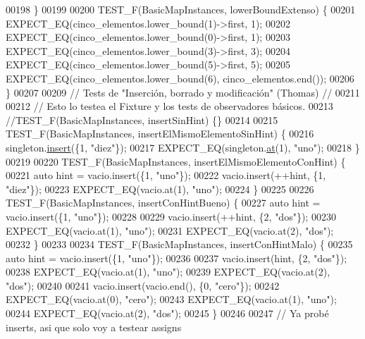 \begin{DoxyCode}
00198 \}
00199 
00200 TEST\_F(BasicMapInstances, lowerBoundExtenso) \{
00201     EXPECT\_EQ(cinco\_elementos.lower\_bound(1)->first, 1);
00202     EXPECT\_EQ(cinco\_elementos.lower\_bound(0)->first, 1);
00203     EXPECT\_EQ(cinco\_elementos.lower\_bound(3)->first, 3);
00204     EXPECT\_EQ(cinco\_elementos.lower\_bound(5)->first, 5);
00205     EXPECT\_EQ(cinco\_elementos.lower\_bound(6), cinco\_elementos.end());
00206 \}
00207 
00209 \textcolor{comment}{// Tests de "Inserción, borrado y modificación" (Thomas) //}
00211 \textcolor{comment}{}
00212 \textcolor{comment}{// Esto lo testea el Fixture y los tests de observadores básicos.}
00213 \textcolor{comment}{//TEST\_F(BasicMapInstances, insertSinHint) \{\}}
00214 
00215 TEST\_F(BasicMapInstances, insertElMismoElementoSinHint) \{
00216     singleton.\hyperlink{classaed2_1_1map_a60aacba06b1579630b3c8e996cf248c8_a60aacba06b1579630b3c8e996cf248c8}{insert}(\{1, \textcolor{stringliteral}{"diez"}\});
00217     EXPECT\_EQ(singleton.\hyperlink{classaed2_1_1map_a0b0a11f906da2926f9eb342fcee79fd7_a0b0a11f906da2926f9eb342fcee79fd7}{at}(1), \textcolor{stringliteral}{"uno"});
00218 \}
00219 
00220 TEST\_F(BasicMapInstances, insertElMismoElementoConHint) \{
00221     \textcolor{keyword}{auto} hint = vacio.insert(\{1, \textcolor{stringliteral}{"uno"}\});
00222     vacio.insert(++hint, \{1, \textcolor{stringliteral}{"diez"}\});
00223     EXPECT\_EQ(vacio.at(1), \textcolor{stringliteral}{"uno"});
00224 \}
00225 
00226 TEST\_F(BasicMapInstances, insertConHintBueno) \{
00227     \textcolor{keyword}{auto} hint = vacio.insert(\{1, \textcolor{stringliteral}{"uno"}\});
00228 
00229     vacio.insert(++hint, \{2, \textcolor{stringliteral}{"dos"}\});
00230     EXPECT\_EQ(vacio.at(1), \textcolor{stringliteral}{"uno"});
00231     EXPECT\_EQ(vacio.at(2), \textcolor{stringliteral}{"dos"});
00232 \}
00233 
00234 TEST\_F(BasicMapInstances, insertConHintMalo) \{
00235     \textcolor{keyword}{auto} hint = vacio.insert(\{1, \textcolor{stringliteral}{"uno"}\});
00236 
00237     vacio.insert(hint, \{2, \textcolor{stringliteral}{"dos"}\});
00238     EXPECT\_EQ(vacio.at(1), \textcolor{stringliteral}{"uno"});
00239     EXPECT\_EQ(vacio.at(2), \textcolor{stringliteral}{"dos"});
00240 
00241     vacio.insert(vacio.end(), \{0, \textcolor{stringliteral}{"cero"}\});
00242     EXPECT\_EQ(vacio.at(0), \textcolor{stringliteral}{"cero"});
00243     EXPECT\_EQ(vacio.at(1), \textcolor{stringliteral}{"uno"});
00244     EXPECT\_EQ(vacio.at(2), \textcolor{stringliteral}{"dos"});
00245 \}
00246 
00247 \textcolor{comment}{// Ya probé inserts, asi que solo voy a testear assigns}

\end{DoxyCode}
